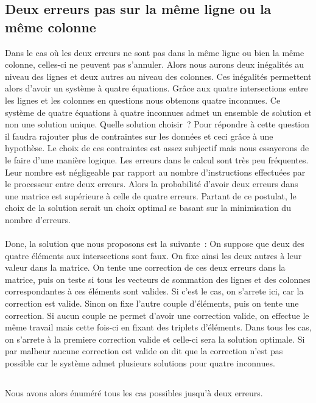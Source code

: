\documentclass[a4paper,10pt]{report}
\begin{document}
\subsection{Deux erreurs pas sur la même ligne ou la même colonne}
Dans le cas où les deux erreurs ne sont pas dans la même ligne ou bien la même colonne, celles-ci ne peuvent pas s’annuler. 
Alors nous aurons deux inégalités au niveau des lignes et deux autres au niveau des colonnes. Ces inégalités permettent 
alors d’avoir un système à quatre équations. Grâce aux quatre intersections entre les lignes et les colonnes en questions 
nous obtenons quatre inconnues.\newline
Ce système de quatre équations à quatre inconnues admet un ensemble de solution et non une solution unique. Quelle solution 
choisir ? Pour répondre à cette question il faudra rajouter plus de contraintes sur les données et ceci grâce à une hypothèse. 
Le choix de ces contraintes est assez subjectif mais nous essayerons de le faire d’une manière logique.
Les erreurs dans le calcul sont très peu fréquentes. Leur nombre est négligeable par rapport au nombre d’instructions 
effectuées par le processeur entre deux erreurs. Alors la probabilité d’avoir deux erreurs dans une matrice est supérieure 
à celle de quatre erreurs. Partant de ce postulat, le choix de la solution serait un choix optimal se basant sur la 
minimisation du nombre d’erreurs.
\paragraph*{}
Donc, la solution que nous proposons est la suivante :\newline
On suppose que deux des quatre éléments aux intersections sont faux. On fixe ainsi les deux autres à leur valeur dans 
la matrice. On tente une correction de ces deux erreurs dans la matrice, puis on teste si tous les vecteurs de sommation 
des lignes et des colonnes correspondantes à ces éléments sont valides. Si c'est le cas, on s'arrete ici, car la correction
est valide. Sinon on fixe l'autre couple d'éléments, puis on tente une correction. Si aucun couple ne permet d'avoir une 
correction valide, on effectue le même travail mais cette fois-ci en fixant des triplets d'éléments. Dans tous les cas, on 
s'arrete à la premiere correction valide et celle-ci sera la solution optimale.
Si par malheur aucune correction est valide on dit que la correction n'est pas possible car le système admet plusieurs solutions 
pour quatre inconnues.

\subsection*{}
Nous avons alors énuméré tous les cas possibles jusqu'à deux erreurs.
\end{document}
